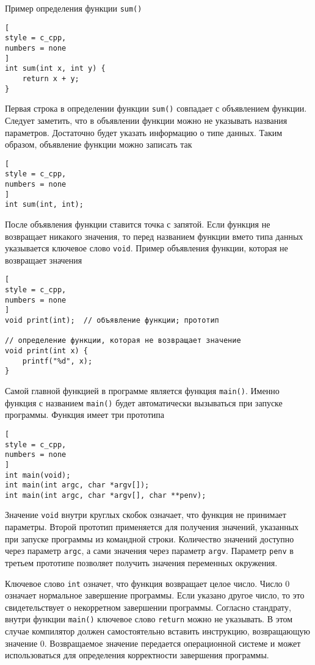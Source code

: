 \documentclass[%
	11pt,
	a4paper,
	utf8,
		]{article}
\begin{document}
Пример определения функции \verb|sum()|
\begin{lstlisting}[
style = c_cpp,
numbers = none
]
int sum(int x, int y) {
    return x + y;
}
\end{lstlisting}

Первая строка в определении функции \verb|sum()| совпадает с объявлением функции. Следует заметить, что в объявлении функции можно не указывать названия параметров. Достаточно будет указать информацию о типе данных. Таким образом, объявление функции можно записать так
\begin{lstlisting}[
style = c_cpp,
numbers = none
]
int sum(int, int);
\end{lstlisting}

После объявления функции ставится точка с запятой. Если функция не возвращает никакого значения, то перед названием функции вмето типа данных указывается ключевое слово \verb|void|. Пример объявления функции, которая не возвращает значения
\begin{lstlisting}[
style = c_cpp,
numbers = none
]
void print(int);  // объявление функции; прототип

// определение функции, которая не возвращает значение
void print(int x) {
    printf("%d", x);
}
\end{lstlisting}

Самой главной функцией в программе является функция \verb|main()|. Именно функция с названием \verb|main()| будет автоматически вызываться при запуске программы. Функция имеет три прототипа
\begin{lstlisting}[
style = c_cpp,
numbers = none
]
int main(void);
int main(int argc, char *argv[]);
int main(int argc, char *argv[], char **penv);
\end{lstlisting}

Значение \verb|void| внутри круглых скобок означает, что функция не принимает параметры. Второй прототип применяется для получения значений, указанных при запуске программы из командной строки. Количество значений доступно через параметр \verb|argc|, а сами значения через параметр \verb|argv|. Параметр \verb|penv| в третьем прототипе позволяет получить значения переменных окружения.

Ключевое слово \verb|int| означет, что функция возвращает целое число. Число 0 означает нормальное завершение программы. Если указано другое число, то это свидетельствует о некорретном завершении программы. Согласно стандрату, внутри функции \verb|main()| ключевое слово \verb|return| можно не указывать. В этом случае компилятор должен самостоятельно вставить инструкцию, возвращающую значение 0. Возвращаемое значение передается операционной системе и может использоваться для определения корректности завершения программы.
\end{document}
